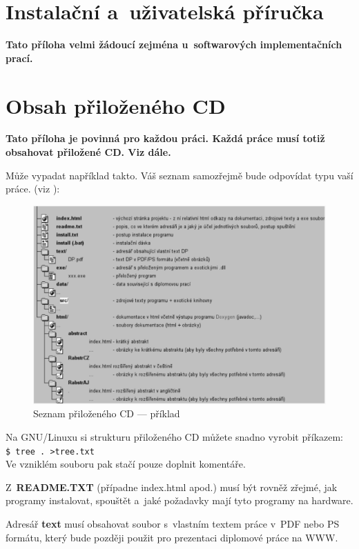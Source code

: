 \documentclass[11pt,twoside,a4paper]{book}
\begin{document}
\chapter{Instalační a~uživatelská příručka}
\textbf{\large Tato příloha velmi žádoucí zejména u~softwarových implementačních prací.}

\chapter{Obsah přiloženého CD}
\textbf{\large Tato příloha je povinná pro každou práci. Každá práce musí totiž obsahovat přiložené CD. Viz dále.}

Může vypadat například takto. Váš seznam samozřejmě bude odpovídat typu vaší práce. (viz \cite{infodp}):

\begin{figure}[h]
\begin{center}
\includegraphics[width=14cm]{figures/seznamcd}
\caption{Seznam přiloženého CD --- příklad}
\label{fig:seznamcd}
\end{center}
\end{figure}

Na GNU/Linuxu si strukturu přiloženého CD můžete snadno vyrobit příkazem:\\ 
\verb|$ tree . >tree.txt|\\
Ve vzniklém souboru pak stačí pouze doplnit komentáře.

Z~\textbf{README.TXT} (případne index.html apod.)  musí být rovněž zřejmé, jak programy instalovat, spouštět a~jaké
požadavky mají tyto programy na hardware.

Adresář \textbf{text}  musí obsahovat soubor s~vlastním textem práce v~PDF nebo PS formátu, který bude později použit
pro prezentaci diplomové práce na WWW.
\end{document}
